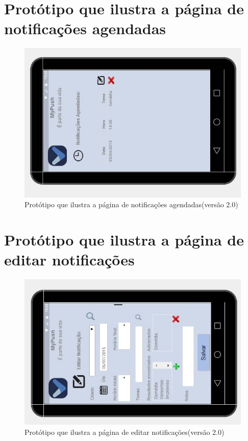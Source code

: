 \begin{apendicesenv}
      \section*{Protótipo que ilustra a página de notificações agendadas}

    \begin{figure}[!htbp]
      \centering
      \includegraphics[scale=0.5, angle=-90]{editaveis/figuras/prototipo_alta_fidelidade_v2/2_7}
      \caption{Protótipo que ilustra a página de notificações agendadas(versão 2.0)}
      \label{v2}
    \end{figure}
    
      \section*{Protótipo que ilustra a página de editar notificações}

    \begin{figure}[!htbp]
      \centering
      \includegraphics[scale=0.5, angle=-90]{editaveis/figuras/prototipo_alta_fidelidade_v2/2_8}
      \caption{Protótipo que ilustra a página de editar notificações(versão 2.0)}
      \label{v2}
    \end{figure}
    

\end{apendicesenv}
